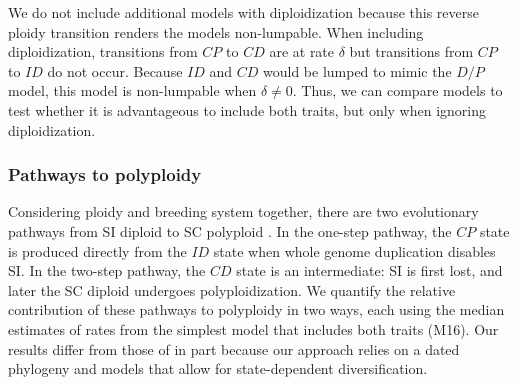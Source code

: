 We do not include additional models with diploidization because this reverse ploidy transition renders the models non-lumpable.
When including diploidization, transitions from $CP$ to $CD$ are at rate $\delta$ but transitions from $CP$ to $ID$ do not occur.
Because $ID$ and $CD$ would be lumped to mimic the $D/P$ model, this model is non-lumpable when $\delta \ne 0$.
Thus, we can compare models to test whether it is advantageous to include both traits, but only when ignoring diploidization.

\subsubsection{Pathways to polyploidy}

Considering ploidy and breeding system together, there are two evolutionary pathways from SI diploid to SC polyploid \citep{brunet2001, robertson_2011}.
In the one-step pathway, the $CP$ state is produced directly from the $ID$ state when whole genome duplication disables SI.
In the two-step pathway, the $CD$ state is an intermediate: SI is first lost, and later the SC diploid undergoes polyploidization.
We quantify the relative contribution of these pathways to polyploidy in two ways, each using the median estimates of rates from the simplest model that includes both traits (M16). 
Our results differ from those of \citet{robertson_2011} in part because our approach relies on a dated phylogeny and models that allow for state-dependent diversification. %

